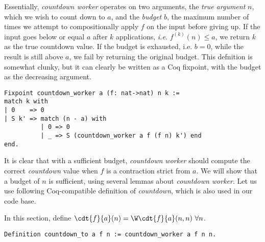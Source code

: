 Essentially, \emph{countdown worker} operates on two arguments, the \emph{true argument} $n$, which we wish to count down to $a$, and the \emph{budget} $b$,
the maximum number of times we attempt to compositionally
apply $f$ on the input before giving up. If the input goes below or equal $a$ after $k$ applications, \emph{i.e.} $f^{(k)}(n) \le a$, we return $k$ as the true countdown value. If the budget is exhausted, i.e. $b = 0$, while the result is still above $a$,
we fail by returning the original budget. This defnition is somewhat clunky, but it can clearly be written as a Coq fixpoint, with the budget as the decreasing
argument.
\begin{lstlisting}
Fixpoint countdown_worker a (f: nat->nat) n k :=
match k with
| 0    => 0
| S k' => match (n - a) with
          | 0 => 0
          | _ => S (countdown_worker a f (f n) k') end
end.
\end{lstlisting}
It is clear that with a sufficient budget, \emph{countdown worker} should compute the correct \emph{countdown} value when $f$ is a contraction strict from $a$. We will show that a budget of $n$ is sufficient, using several lemmas about \emph{countdown worker}. Let us use following Coq-compatible definition of \emph{countdown}, which is also used in our code base.
\begin{defn} \label{defn: countdown}
In this section, define  $\cdt{f}{a}(n) = \W\cdt{f}{a}(n, n) \ \forall n$.
\begin{lstlisting}
Definition countdown_to a f n := countdown_worker a f n n.
\end{lstlisting}
\end{defn}

